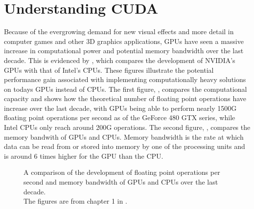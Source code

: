 \chapter{Understanding CUDA}\label{chp:GPGPU}



Because of the evergrowing demand for new visual effects and more detail in
computer games and other 3D graphics applications, GPUs have seen a massive
increase in computational power and potential memory bandwidth over the last
decade. This is evidenced by , which compares the
development of NVIDIA's GPUs with that of Intel's CPUs. These figures illustrate
the potential performance gain associated with implementing computationally
heavy solutions on todays GPUs instead of CPUs. The first figure,
, compares the computational capacity and shows how the
theoretical number of floating point operations have increase over the last
decade, with GPUs being able to perform nearly 1500G floating point operations
per second as of the GeForce 480 GTX series, while Intel CPUs only reach around
200G operations. The second figure, , compares the
memory bandwith of GPUs and CPUs. Memory bandwidth is the rate at which data can
be read from or stored into memory by one of the processing units and is around
6 times higher for the GPU than the CPU.

\begin{figure}
  \centering 

  \hspace{0.05\textwidth}
  
  \caption[Comparison of FLOPS and memory bandwidth on GPUs and CPUs.]{A comparison
    of the development of floating point operations per second and memory
    bandwidth of GPUs and CPUs over the last decade. \\The figures are from chapter 1 in
    .}\label{fig:gpuCpuCompare}
\end{figure}

